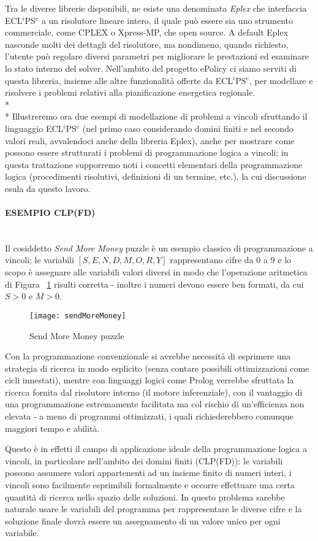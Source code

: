 \documentclass[12pt,a4paper,openright,twoside]{report}
\newcommand{\myparagraph}[1]{\paragraph{#1}\mbox{}\\}
\begin{document}
Tra le diverse librerie disponibili, ne esiste una denominata \emph{Eplex} \cite{eplex} che interfaccia ECL$^i$PS$^e$ a un risolutore lineare intero, il quale può essere sia uno strumento commerciale, come CPLEX o Xpress-MP, che open source. A default Eplex nasconde molti dei dettagli del risolutore, ma nondimeno, quando richiesto, l'utente può regolare diversi parametri per migliorare le prestazioni ed esaminare lo stato interno del solver. Nell'ambito del progetto ePolicy ci siamo serviti di questa libreria, insieme alle altre funzionalità offerte da ECL$^i$PS$^e$, per modellare e risolvere i problemi relativi alla pianificazione energetica regionale.
\\*\\*
Illustreremo ora due esempi di modellazione di problemi a vincoli sfruttando il linguaggio ECL$^i$PS$^e$ (nel primo caso considerando domini finiti e nel secondo valori reali, avvalendoci anche della libreria Eplex), anche per mostrare come possono essere strutturati i problemi di programmazione logica a vincoli; in questa trattazione supporremo noti i concetti elementari della programmazione logica (procedimenti risolutivi, definizioni di un termine, etc.), la cui discussione esula da questo lavoro.

\myparagraph{ESEMPIO CLP(FD)}
Il cosiddetto \emph{Send More Money} puzzle è un esempio classico di programmazione a vincoli; le variabili $[S,E,N,D,M,O,R,Y]$ rappresentano cifre da 0 a 9 e lo scopo è assegnare alle variabili valori diversi in modo che l'operazione aritmetica di Figura ~\ref{SendMoreMoney} risulti corretta - inoltre i numeri devono essere ben formati, da cui $S>0$ e $M>0$. 

\begin{figure}[h]
	\centering
	\texttt{[image: sendMoreMoney]}
	\caption{Send More Money puzzle}
	\label{SendMoreMoney}
\end{figure}

Con la programmazione convenzionale si avrebbe necessità di esprimere una strategia di ricerca in modo esplicito (senza contare possibili ottimizzazioni come cicli innestati), mentre con linguaggi logici come Prolog verrebbe sfruttata la ricerca fornita dal risolutore interno (il motore inferenziale), con il vantaggio di una programmazione estremamente facilitata ma col rischio di un'efficienza non elevata - a meno di programmi ottimizzati, i quali richiederebbero comunque maggiori tempo e abilità. 

Questo è in effetti il campo di applicazione ideale della programmazione logica a vincoli, in particolare nell'ambito  dei domini finiti (CLP(FD)): le variabili possono assumere valori appartenenti ad un insieme finito di numeri interi, i vincoli sono facilmente esprimibili formalmente e occorre effettuare una certa quantità di ricerca nello spazio delle soluzioni. In questo problema sarebbe naturale usare le variabili del programma per rappresentare le diverse cifre e la soluzione finale dovrà essere un assegnamento di un valore unico per ogni variabile. 
\end{document}
